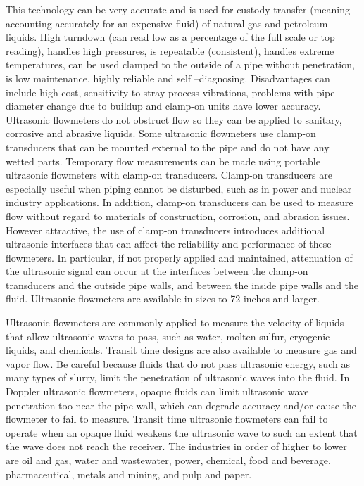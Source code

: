 \documentclass[a4paper,12pt]{article}
\begin{document}
  This technology can be very accurate and is used for custody transfer (meaning accounting accurately for an expensive fluid) of natural gas and petroleum liquids. High turndown (can read low as a percentage of the full scale or top reading), handles high pressures, is repeatable (consistent), handles extreme temperatures, can be used clamped to the outside of a pipe without penetration, is low maintenance, highly reliable and self –diagnosing. Disadvantages can include high cost, sensitivity to stray process vibrations, problems with pipe diameter change due to buildup and clamp-on units have lower accuracy.
  Ultrasonic flowmeters do not obstruct flow so they can be applied to sanitary, corrosive and abrasive liquids. Some ultrasonic flowmeters use clamp-on transducers that can be mounted external to the pipe and do not have any wetted parts. Temporary flow measurements can be made using portable ultrasonic flowmeters with clamp-on transducers. Clamp-on transducers are especially useful when piping cannot be disturbed, such as in power and nuclear industry applications. In addition, clamp-on transducers can be used to measure flow without regard to materials of construction, corrosion, and abrasion issues. However attractive, the use of clamp-on transducers introduces additional ultrasonic interfaces that can affect the reliability and performance of these flowmeters. In particular, if not properly applied and maintained, attenuation of the ultrasonic signal can occur at the interfaces between the clamp-on transducers and the outside pipe walls, and between the inside pipe walls and the fluid.
  Ultrasonic flowmeters are available in sizes to 72 inches and larger.
  
  Ultrasonic flowmeters are commonly applied to measure the velocity of liquids that allow ultrasonic waves to pass, such as water, molten sulfur, cryogenic liquids, and chemicals. Transit time designs are also available to measure gas and vapor flow. Be careful because fluids that do not pass ultrasonic energy, such as many types of slurry, limit the penetration of ultrasonic waves into the fluid. In Doppler ultrasonic flowmeters, opaque fluids can limit ultrasonic wave penetration too near the pipe wall, which can degrade accuracy and/or cause the flowmeter to fail to measure. Transit time ultrasonic flowmeters can fail to operate when an opaque fluid weakens the ultrasonic wave to such an extent that the wave does not reach the receiver.
 The industries in order of higher to lower are oil and gas, water and wastewater, power, chemical, food and beverage, pharmaceutical, metals and mining, and pulp and paper.
 
\end{document}
